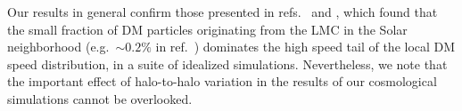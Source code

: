 Our results in general confirm those presented in refs.~\cite{Donaldson:2021byu} and \cite{Besla:2019xbx}, which found that the small fraction of DM particles originating from the LMC in the Solar neighborhood (e.g.~$\sim 0.2\%$ in ref.~\cite{Besla:2019xbx}) dominates the high speed tail of the local DM speed distribution, in a suite of idealized simulations. Nevertheless, we note that the important effect of halo-to-halo variation in the results of our cosmological simulations cannot be overlooked.




